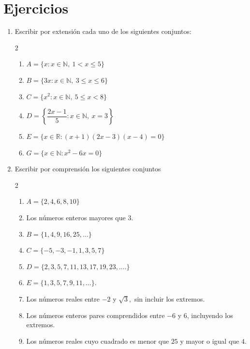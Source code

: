 \documentclass[12pt]{article}
\begin{document}
% 






\newpage
\section{Ejercicios}
\begin{enumerate}
    \item Escribir por extensión cada uno de los siguientes conjuntos:
    \begin{multicols}{2}
        \begin{enumerate}
    \item $
A = \{x : x \in \mathbb{N},\ 1 < x \le 5\}
$
\item $
B = \{3x : x \in \mathbb{N},\ 3 \le x \le 6\}
$
\item $
C = \{x^{2} : x \in \mathbb{N},\ 5 \le x < 8\}
$
\item $
D = \left\{ \dfrac{2x - 1}{5} :x \in \mathbb{N},\ x = 3 \right\}
$
\item $E= \{x\in \mathbb{R}: (x+1)(2x-3)(x-4)=0\}$
\item $G=\{x\in \mathbb{N}: x^2-6x=0\}$
\end{enumerate}
    \end{multicols}


\item Escribir por comprensión los siguientes conjuntos
\begin{multicols}{2}
    \begin{enumerate}
    \item $A = \{2,4,6,8,10\}$
    \item Los números enteros mayores que $3$.
    \item $B=\{1, 4, 9,  16, 25, ...\}$
    \item $C=\{-5, -3, -1 , 1, 3, 5, 7\}$
    \item $D=\{2, 3, 5, 7, 11, 13, 17, 19, 23, ....\}$
    \item $E=\{1,3,5,7,9,11,\ldots\}$.
    \item Los números reales entre $-2$ y $\sqrt{3},$ sin incluir los extremos.
    \item Los números enteros pares comprendidos entre $-6$ y $6$, incluyendo los extremos.
    \item Los números reales cuyo cuadrado es menor que $25$ y mayor o igual que $4$.
\end{enumerate}
\end{multicols}



\end{enumerate}
\end{document}
